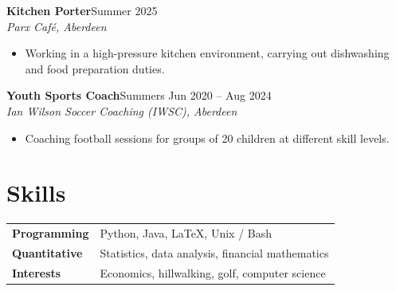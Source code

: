 \documentclass[10pt, a4paper]{article}
\newcommand{\entry}[3]{%
  \vspace{3pt}
  \noindent
  \textbf{\color{charcoal}#1}\hfill{\color{mgrey}\small #3}\\[-2pt]
  {\color{myblue}\itshape\small #2}
  \vspace{1pt}
}
\begin{document}
\entry{Kitchen Porter}{Parx Caf\'{e}, Aberdeen}{Summer 2025}
\begin{itemize}
  \item Working in a high-pressure kitchen environment, carrying out dishwashing and food preparation duties.
\end{itemize}

\entry{Youth Sports Coach}{Ian Wilson Soccer Coaching (IWSC), Aberdeen}{Summers Jun 2020 -- Aug 2024}
\begin{itemize}
  \item Coaching football sessions for groups of 20 children at different skill levels.
\end{itemize}

\section{Skills}

\vspace{2pt}
\begin{tabular}{@{}p{2.8cm} l@{}}
  \textbf{Programming}  & Python, Java, LaTeX, Unix / Bash \\[3pt]
  \textbf{Quantitative} & Statistics, data analysis, financial mathematics \\[3pt]
  \textbf{Interests}    & Economics, hillwalking, golf, computer science \\
\end{tabular}





\vfill
\end{document}
